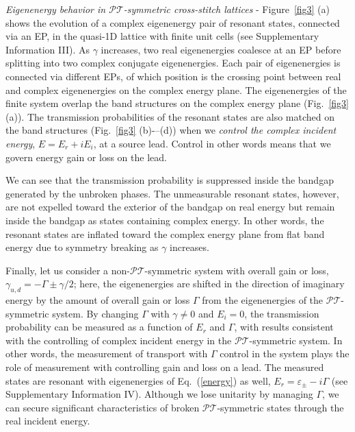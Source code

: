 \documentclass[report,epsfig,pre]{revtex4}
\begin{document}
{\it Eigenenergy behavior in $\mathcal{PT}$-symmetric cross-stitch lattices} -
Figure~\ref{fig3} (a) shows the evolution of a complex eigenenergy pair of resonant states, connected via an EP, in the quasi-1D lattice with finite unit cells (see Supplementary Information III). As $\gamma$ increases, two real eigenenergies coalesce at an EP before splitting into two complex conjugate eigenenergies. Each pair of eigenenergies is connected via different EPs, of which position is the crossing point between real and complex eigenenergies on the complex energy plane.
The eigenenergies of the finite system overlap the band structures on the complex energy plane (Fig.~\ref{fig3} (a)). The transmission probabilities of the resonant states are also matched on the band structures (Fig.~\ref{fig3} (b)-–(d)) when we {\it control the complex incident energy}, $E=E_r+iE_i$, at a source lead. Control in other words means that we govern energy gain or loss on the lead.

We can see that the transmission probability is suppressed inside the bandgap generated by the unbroken phases. The unmeasurable resonant states, however, are not expelled toward the exterior of the bandgap on real energy but remain inside the bandgap as states containing complex energy. In other words, the resonant states are inflated toward the complex energy plane from flat band energy due to symmetry breaking as $\gamma$ increases.

Finally, let us consider a non-$\mathcal{PT}$-symmetric system with overall gain or loss, $\gamma_{u,d}=-\Gamma\pm\gamma/2$; here, the eigenenergies are shifted in the direction of imaginary energy by the amount of overall gain or loss $\Gamma$ from the eigenenergies of the $\mathcal{PT}$-symmetric system. By changing $\Gamma$ with $\gamma \neq 0$ and $E_i=0$, the transmission probability can be measured as a function of $E_r$ and $\Gamma$, with results consistent with the controlling of complex incident energy in the $\mathcal{PT}$-symmetric system. In other words, the measurement of transport with $\Gamma$ control in the system plays the role of measurement with controlling gain and loss on a lead. The measured states are resonant with eigenenergies of Eq.~(\ref{energy}) as well, $E_r=\varepsilon_{\pm}-i\Gamma$ (see Supplementary Information IV).
Although we lose unitarity by managing $\Gamma$, we can secure significant characteristics of broken $\mathcal{PT}$-symmetric states through the real incident energy.
\end{document}
